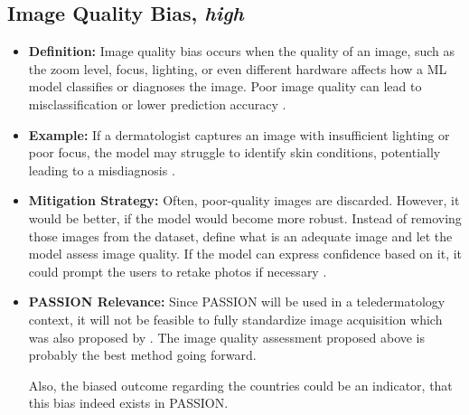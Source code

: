 \documentclass[12pt, a4paper, oneside]{book}   	%
\begin{document}
\begin{appendices}
		\subsection{Image Quality Bias, \textit{high}} \label{app:biasImageQuality}
		\begin{itemize}
			\item \textbf{Definition:} Image quality bias occurs when the quality of an image, such as the zoom level, focus, lighting, or even different hardware affects how a \gls{ML} model classifies or diagnoses the image. Poor image quality can lead to misclassification or lower prediction accuracy \autocite{Young_2020}.
			\item \textbf{Example:} If a dermatologist captures an image with insufficient lighting or poor focus, the model may struggle to identify skin conditions, potentially leading to a misdiagnosis \autocite{Young_2020}.
			\item \textbf{Mitigation Strategy:} Often, poor-quality images are discarded. However, it would be better, if the model would become more robust. Instead of removing those images from the dataset, define what is an adequate image and let the model assess image quality. If the model can express confidence based on it, it could prompt the users to retake photos if necessary \autocite{Young_2020}.
			\item \textbf{PASSION Relevance:} Since PASSION will be used in a \gls{teledermatology} context, it will not be feasible to fully standardize image acquisition which was also proposed by \textcite{Young_2020}. The image quality assessment proposed above is probably the best method going forward.
			
			Also, the biased outcome regarding the countries could be an indicator, that this bias indeed exists in PASSION.
		\end{itemize}
		

\end{appendices}
\end{document}
